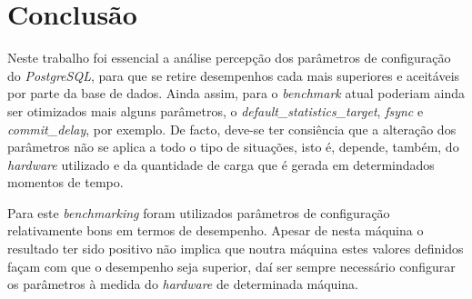 \section{Conclusão}

Neste trabalho foi essencial a análise percepção dos parâmetros de configuração do \textit{PostgreSQL}, para que se retire desempenhos cada mais superiores e aceitáveis por parte da base de dados. Ainda assim, para o \textit{benchmark} atual poderiam ainda ser otimizados mais alguns parâmetros, o \textit{default\_statistics\_target}, \textit{fsync} e \textit{commit\_delay}, por exemplo. De facto, deve-se ter consiência que a alteração dos parâmetros não se aplica a todo o tipo de situações, isto é, depende, também, do \textit{hardware} utilizado e da quantidade de carga que é gerada em determindados momentos de tempo.

Para este \textit{benchmarking} foram utilizados parâmetros de configuração relativamente bons em termos de desempenho. Apesar de nesta máquina o resultado ter sido positivo não implica que noutra máquina estes valores definidos façam com que o desempenho seja superior, daí ser sempre necessário configurar os parâmetros à medida do \textit{hardware} de determinada máquina.
